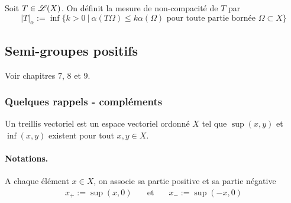 
%

\begin{definition}
    Soit $T \in \mathscr{L}(X)$. On définit la \textcolor{astral}{mesure de non-compacité de $T$} par 
    \begin{equation*}
        |T|_{\alpha} := \inf\big\{ k>0 \ | \ \alpha(T\Omega) \leq k \alpha(\Omega) \text{ pour toute partie bornée } \Omega \subset X \big\}
    \end{equation*}
\end{definition}


%    

\subsection{Semi-groupes positifs}
Voir \cite{Clement1987} chapitres $7$, $8$ et $9$.
\subsubsection{Quelques rappels - compléments}
\begin{definition}
    Un \textcolor{astral}{treillis vectoriel} est un espace vectoriel ordonné $X$ tel que $\sup(x,y)$ et $\inf(x,y)$ existent pour tout $x,y \in X$.
\end{definition}

\paragraph{Notations.} A chaque élément $x \in X$, on associe sa partie positive et sa partie négative 
\begin{eqnarray*}
    x_+ := \sup(x,0) \ \ \ &\text{ et }& \ \ \ x_-:=\sup(-x,0)
\end{eqnarray*}

